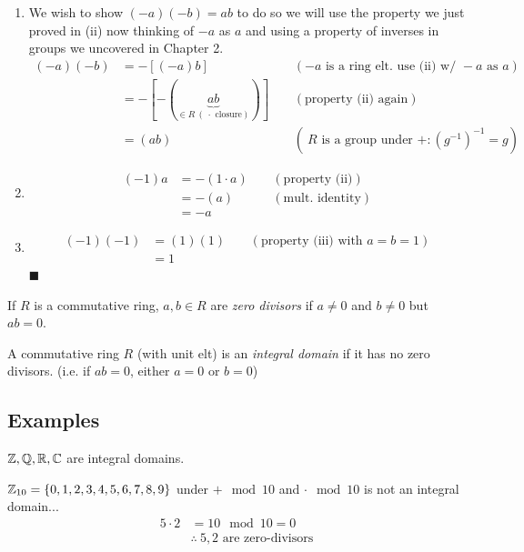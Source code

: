 \begin{lemma}
\begin{enumerate}[label=(\roman*)]
    \item We wish to show $(-a)(-b)=ab$ to do so we will use the property we just proved in (ii) now thinking of $-a$ as $a$ and using a property of inverses in groups we uncovered in Chapter 2.
    \begin{align}
        (-a)(-b)&= -[(-a)b] \ \ \ \ \ & (-a \text{ is a ring elt. use (ii) w/ }-a \text{ as }a ) \nonumber \\
        &= -[-(\underbrace{ab}_{\in R \ (\ \cdot \text{ closure})})] \ \ \ \ \ & ( \text{property (ii) again}) \nonumber \\
        &= (ab) \ \ \ \ \ & (\ R\text{ is a group under }+: (g^{-1})^{-1}=g) \nonumber
    \end{align}
    \item \begin{align}
        (-1)a&= -(1\cdot a) \ \ \ \ \ & ( \text{property (ii)}) \nonumber \\
        &= -(a) \ \ \ \ \ & (\text{mult. identity}) \nonumber \\
        &= -a \nonumber
    \end{align}
    \item \begin{align}
        (-1)(-1)&= (1)(1)  \ \ \ \ \ & (\text{property (iii) with }a=b=1) \nonumber \\
        &= 1 \nonumber
    \end{align}
    $\blacksquare$
\end{enumerate}
\end{lemma}

\begin{definition}
If $R$ is a commutative ring, $a,b\in R$ are \textit{zero divisors} if $a\neq 0$ and $b\neq 0$ but $ab=0$.
\end{definition}
\begin{definition}
A commutative ring $R$ (with unit elt) is an \textit{integral domain} if it has no zero divisors. (i.e. if $ab=0$, either $a=0$ or $b=0$)
\end{definition}
\subsection*{Examples}
\begin{example}
${\mathbb{ Z}},{\mathbb{ Q}},{\mathbb{ R}},{\mathbb{ C}}$ are integral domains.
\end{example}
\begin{example}
${\mathbb{ Z}}_{10}=\{0,1,2,3,4,5,6,7,8,9\}$ under $+\mod 10$ and $\cdot \mod 10$ is not an integral domain...
\begin{align}
    5\cdot 2 &= 10\mod 10 = 0 \nonumber \\
    &\therefore \ 5,2 \text{ are zero-divisors} \nonumber
\end{align}
\end{example}

